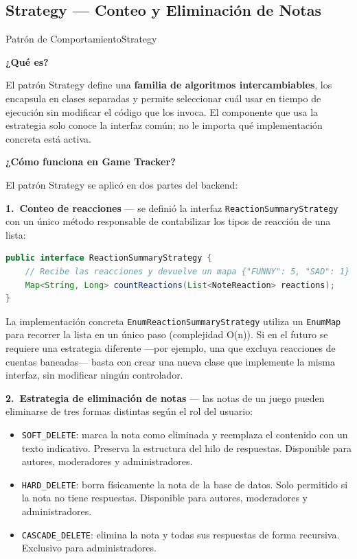 \subsection{Strategy — Conteo y Eliminación de Notas}

\begin{patternbox}{Patrón de Comportamiento}{Strategy}

\textbf{¿Qué es?}

El patrón Strategy define una \textbf{familia de algoritmos intercambiables},
los encapsula en clases separadas y permite seleccionar cuál usar en tiempo
de ejecución sin modificar el código que los invoca. El componente que usa la
estrategia solo conoce la interfaz común; no le importa qué implementación
concreta está activa.

\vspace{0.5em}
\textbf{¿Cómo funciona en Game Tracker?}

El patrón Strategy se aplicó en dos partes del backend:

\textbf{1.\ Conteo de reacciones} --- se definió la interfaz
\texttt{ReactionSummaryStrategy} con un único método responsable de
contabilizar los tipos de reacción de una lista:

\begin{lstlisting}[language=Java]
public interface ReactionSummaryStrategy {
    // Recibe las reacciones y devuelve un mapa {"FUNNY": 5, "SAD": 1}
    Map<String, Long> countReactions(List<NoteReaction> reactions);
}
\end{lstlisting}

La implementación concreta \texttt{EnumReactionSummaryStrategy} utiliza un
\texttt{EnumMap} para recorrer la lista en un único paso (complejidad O(n)).
Si en el futuro se requiere una estrategia diferente —por ejemplo, una que
excluya reacciones de cuentas baneadas— basta con crear una nueva clase que
implemente la misma interfaz, sin modificar ningún controlador.

\textbf{2.\ Estrategia de eliminación de notas} --- las notas de un juego
pueden eliminarse de tres formas distintas según el rol del usuario:

\begin{itemize}
    \item \texttt{SOFT\_DELETE}: marca la nota como eliminada y reemplaza el
    contenido con un texto indicativo. Preserva la estructura del hilo de
    respuestas. Disponible para autores, moderadores y administradores.
    \item \texttt{HARD\_DELETE}: borra físicamente la nota de la base de datos.
    Solo permitido si la nota no tiene respuestas. Disponible para autores,
    moderadores y administradores.
    \item \texttt{CASCADE\_DELETE}: elimina la nota y todas sus respuestas de
    forma recursiva. Exclusivo para administradores.
\end{itemize}


\end{patternbox}
